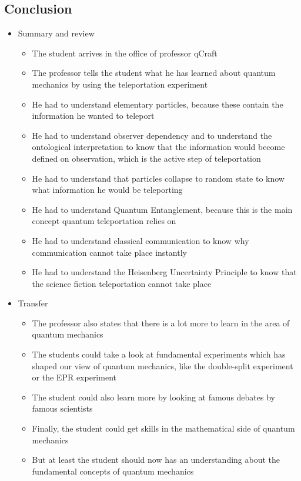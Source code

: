 \documentclass[11pt,twoside]{report} %
\begin{document}
\subsection{Conclusion}

\begin{itemize}
	\item Summary and review
	\begin{itemize}
		\item The student arrives in the office of professor qCraft
		\item The professor tells the student what he has learned about quantum mechanics by using the teleportation experiment
		\item He had to understand elementary particles, because these contain the information he wanted to teleport
		\item He had to understand observer dependency and to understand the ontological interpretation to know that the information would become defined on observation, which is the active step of teleportation
		\item He had to understand that particles collapse to random state to know what information he would be teleporting
		\item He had to understand Quantum Entanglement, because this is the main concept quantum teleportation relies on
		\item He had to understand classical communication to know why communication cannot take place instantly
		\item He had to understand the Heisenberg Uncertainty Principle to know that the science fiction teleportation cannot take place
	\end{itemize}
	\item Transfer
	\begin{itemize}
		\item The professor also states that there is a lot more to learn in the area of quantum mechanics
		\item The students could take a look at fundamental experiments which has shaped our view of quantum mechanics, like the double-split experiment or the EPR experiment
		\item The student could also learn more by looking at famous debates by famous scientists
		\item Finally, the student could get skills in the mathematical side of quantum mechanics
		\item But at least the student should now has an understanding about the fundamental concepts of quantum mechanics

\end{itemize}
\end{itemize}
\end{document}

